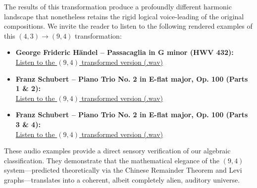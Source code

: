 \documentclass[12pt,letterpaper]{amsart}
\begin{document}
The results of this transformation produce a profoundly different harmonic landscape that nonetheless retains the rigid logical voice-leading of the original compositions. We invite the reader to listen to the following rendered examples of this $(4,3) \to (9,4)$ transformation:

\begin{itemize}
    \item \textbf{George Frideric Händel -- Passacaglia in G minor (HWV 432):}\\
    \href{https://www.fuw.edu.pl/~nurowski/passacaglia_transformed.wav}{Listen to the $(9,4)$ transformed version (.wav)}
    
    \item \textbf{Franz Schubert -- Piano Trio No. 2 in E-flat major, Op. 100 (Parts 1 \& 2):}\\
    \href{https://www.fuw.edu.pl/~nurowski/schubert_trio_transformed.wav}{Listen to the $(9,4)$ transformed version (.wav)}
    
    \item \textbf{Franz Schubert -- Piano Trio No. 2 in E-flat major, Op. 100 (Parts 3 \& 4):}\\
    \href{https://www.fuw.edu.pl/~nurowski/schubert_trio_transformed_parts3_4.wav}{Listen to the $(9,4)$ transformed version (.wav)}
\end{itemize}

These audio examples provide a direct sensory verification of our algebraic classification. They demonstrate that the mathematical elegance of the $(9,4)$ system---predicted theoretically via the Chinese Remainder Theorem and Levi graphs---translates into a coherent, albeit completely alien, auditory universe.
\end{document}

